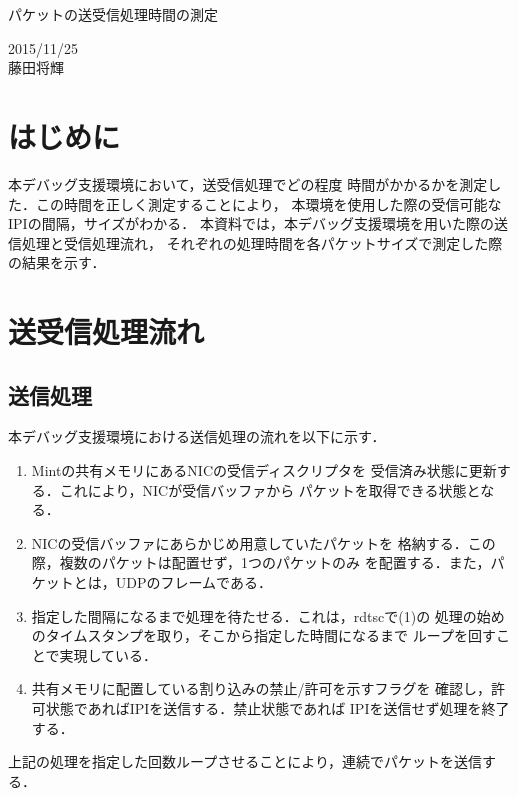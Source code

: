\documentclass[12pt]{jsarticle}
\begin{document}

\begin{center}
    {\LARGE パケットの送受信処理時間の測定}
\end{center}

\begin{flushright}
    2015/11/25\\
    藤田将輝
\end{flushright}
\section{はじめに}
本デバッグ支援環境において，送受信処理でどの程度
時間がかかるかを測定した．この時間を正しく測定することにより，
本環境を使用した際の受信可能なIPIの間隔，サイズがわかる．
本資料では，本デバッグ支援環境を用いた際の送信処理と受信処理流れ，
それぞれの処理時間を各パケットサイズで測定した際の結果を示す．

\section{送受信処理流れ}
\subsection{送信処理}
本デバッグ支援環境における送信処理の流れを以下に示す．
\begin{enumerate}
    \item Mintの共有メモリにあるNICの受信ディスクリプタを
        受信済み状態に更新する．これにより，NICが受信バッファから
        パケットを取得できる状態となる．
    \item NICの受信バッファにあらかじめ用意していたパケットを
        格納する．この際，複数のパケットは配置せず，1つのパケットのみ
        を配置する．また，パケットとは，UDPのフレームである．
    \item 指定した間隔になるまで処理を待たせる．これは，rdtscで(1)の
        処理の始めのタイムスタンプを取り，そこから指定した時間になるまで
        ループを回すことで実現している．
    \item 共有メモリに配置している割り込みの禁止/許可を示すフラグを
        確認し，許可状態であればIPIを送信する．禁止状態であれば
        IPIを送信せず処理を終了する．
\end{enumerate}
上記の処理を指定した回数ループさせることにより，連続でパケットを送信する．
\end{document}
